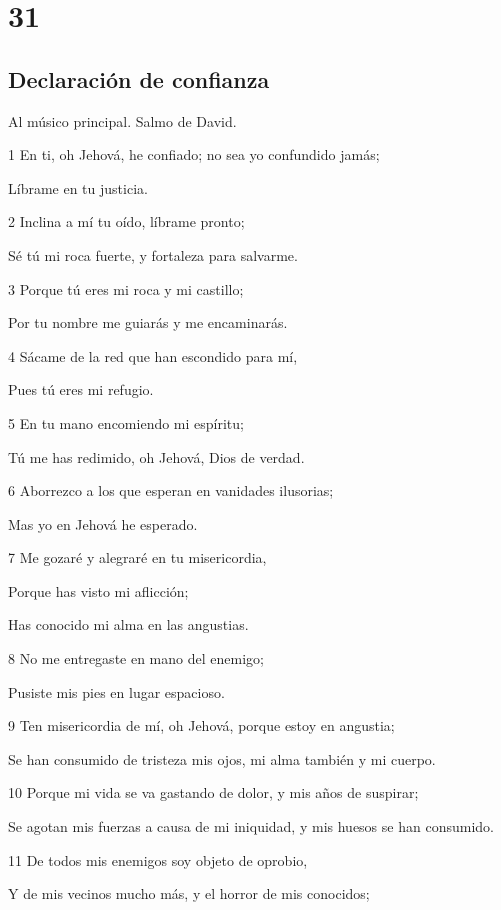 \chapter{31}

\section*{Declaración de confianza}

\par Al músico principal. Salmo de David.

\par 1 En ti, oh Jehová, he confiado; no sea yo confundido jamás;
\par Líbrame en tu justicia.
\par 2 Inclina a mí tu oído, líbrame pronto;
\par Sé tú mi roca fuerte, y fortaleza para salvarme.
\par 3 Porque tú eres mi roca y mi castillo;
\par Por tu nombre me guiarás y me encaminarás.
\par 4 Sácame de la red que han escondido para mí,
\par Pues tú eres mi refugio.
\par 5 En tu mano encomiendo mi espíritu; 
\par Tú me has redimido, oh Jehová, Dios de verdad.
\par 6 Aborrezco a los que esperan en vanidades ilusorias;
\par Mas yo en Jehová he esperado.
\par 7 Me gozaré y alegraré en tu misericordia,
\par Porque has visto mi aflicción;
\par Has conocido mi alma en las angustias.
\par 8 No me entregaste en mano del enemigo;
\par Pusiste mis pies en lugar espacioso.
\par 9 Ten misericordia de mí, oh Jehová, porque estoy en angustia;
\par Se han consumido de tristeza mis ojos, mi alma también y mi cuerpo.
\par 10 Porque mi vida se va gastando de dolor, y mis años de suspirar;
\par Se agotan mis fuerzas a causa de mi iniquidad, y mis huesos se han consumido.
\par 11 De todos mis enemigos soy objeto de oprobio,
\par Y de mis vecinos mucho más, y el horror de mis conocidos;
